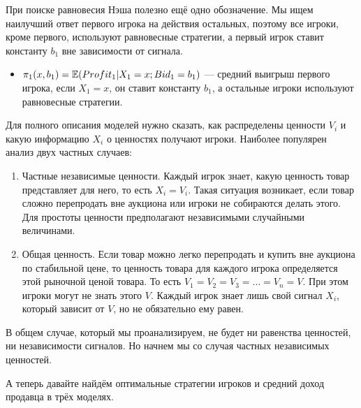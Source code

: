 При поиске равновесия Нэша полезно ещё одно обозначение. Мы ищем наилучший ответ первого игрока на действия остальных, поэтому все игроки, кроме первого, используют равновесные стратегии, а первый игрок ставит константу $b_1$ вне зависимости от сигнала.

\begin{itemize}



\item $\pi_{1}(x,b_{1})=\operatorname{\mathbb{E}}(Profit_{1}|X_{1}=x ; Bid_{1}=b_{1})$ — средний выигрыш первого игрока, если $ X_{1}=x $, он ставит константу $b_{1} $, а остальные игроки используют равновесные стратегии.
\end{itemize}

\newpage


Для полного описания моделей нужно сказать, как распределены ценности $ V_{i} $ и какую информацию $ X_{i} $ о ценностях получают игроки. Наиболее популярен анализ двух частных случаев:
\begin{enumerate}
\item Частные независимые ценности. Каждый игрок знает, какую ценность товар представляет для него, то есть $X_{i}=V_{i}$.
Такая ситуация возникает, если товар сложно перепродать вне аукциона или игроки не собираются делать этого. Для простоты ценности предполагают независимыми случайными величинами.
\item Общая ценность. Если товар можно легко перепродать и купить вне аукциона по стабильной цене, то ценность товара для каждого игрока определяется этой рыночной ценой товара. То есть $ V_{1}=V_{2}=V_{3}=\ldots=V_{n}=V $. При этом игроки могут не знать этого $ V $. Каждый игрок знает лишь свой сигнал $ X_{i} $, который зависит от $ V $, но не обязательно ему равен.
\end{enumerate}

В общем случае, который мы проанализируем, не будет ни равенства ценностей, ни независимости сигналов. Но начнем мы со случая частных независимых ценностей.

А теперь давайте найдём оптимальные стратегии игроков и средний доход продавца в трёх моделях.

